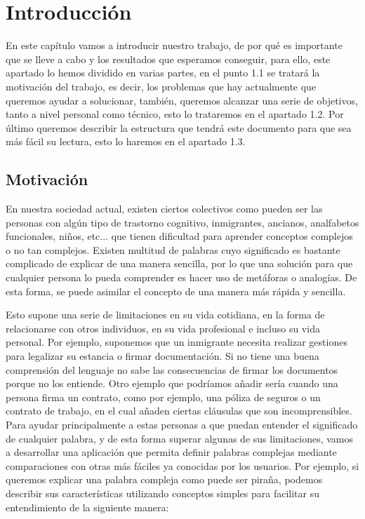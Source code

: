 \chapter{Introducción}
\label{cap:introduccion}



En este capítulo vamos a introducir nuestro trabajo, de por qué es importante que se lleve a cabo y los resultados que esperamos conseguir, para ello, este apartado lo hemos dividido en varias partes, en el punto 1.1 se tratará la motivación del trabajo, es decir, los problemas que hay actualmente que queremos ayudar a solucionar, también, queremos alcanzar una serie de objetivos, tanto a nivel personal como técnico, esto lo trataremos en el apartado 1.2. Por último queremos describir la estructura que tendrá este documento para que sea más fácil su lectura, esto lo haremos en el apartado 1.3. 
	


\section{Motivación}
\label{cap:sec:motivacion}

En nuestra sociedad actual, existen ciertos colectivos como pueden ser las personas con algún tipo de trastorno cognitivo, inmigrantes, ancianos, analfabetos funcionales, niños, etc... que tienen dificultad para aprender conceptos complejos o no tan complejos. 
Existen multitud de palabras cuyo significado es bastante complicado de explicar de una manera sencilla, por lo que una solución para que cualquier persona lo pueda comprender es hacer uso de metáforas o analogías. De esta forma, se puede asimilar el concepto de una manera más rápida y sencilla. 

Esto supone una serie de limitaciones en su vida cotidiana, en la forma de relacionarse con otros individuos, en su vida profesional e incluso su vida personal. Por ejemplo, suponemos que un inmigrante necesita realizar gestiones para legalizar su estancia o firmar documentación. Si no tiene una buena comprensión del lenguaje no sabe las consecuencias de firmar los documentos porque no los entiende. 
Otro ejemplo que podríamos añadir sería cuando una persona firma un contrato, como por ejemplo, una póliza de seguros o un contrato de trabajo, en el cual añaden ciertas cláusulas que son incomprensibles. 
\newline
Para ayudar principalmente a estas personas a que puedan entender el significado de cualquier palabra, y de esta forma superar algunas de sus limitaciones, vamos a desarrollar una aplicación que permita definir palabras complejas mediante comparaciones con otras más fáciles ya conocidas por los usuarios. Por ejemplo, si queremos explicar una palabra compleja como puede ser piraña, podemos describir sus características utilizando conceptos simples para facilitar su entendimiento de la siguiente manera: \newline

